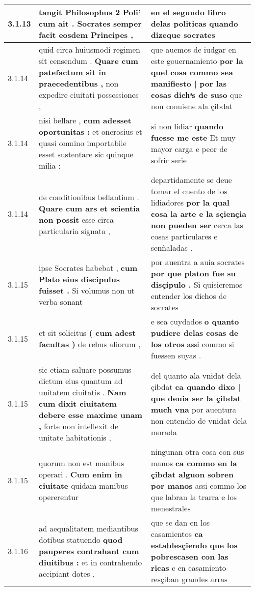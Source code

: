 \begin{tabular}{|p{1cm}|p{6.5cm}|p{6.5cm}|}
3.1.13 & tangit Philosophus 2 Poli’ \textbf{ cum ait . } Socrates semper facit eosdem Principes , & en el segundo libro delas politicas \textbf{ quando } dizeque socrates \\\hline
3.1.14 & quid circa huiusmodi regimen sit censendum . \textbf{ Quare cum patefactum sit in praecedentibus , } non expedire ciuitati possessiones , & que auemos de iudgar en este gouernamiento \textbf{ por la quel cosa commo sea manifiesto | por las cosas dichͣs de suso } que non conuiene ala çibdat \\\hline
3.1.14 & nisi bellare , \textbf{ cum adesset oportunitas : } et onerosius et quasi omnino importabile esset sustentare sic quinque milia : & si non lidiar \textbf{ quando fuesse me este } Et muy mayor carga e peor de sofrir serie \\\hline
3.1.14 & de conditionibus bellantium . \textbf{ Quare cum ars et scientia non possit } esse circa particularia signata , & departidamente se deue tomar el cuento de los lidiadores \textbf{ por la qual cosa la arte e la sçiençia non pueden ser } cerca las cosas particulares e senñaladas . \\\hline
3.1.15 & ipse Socrates habebat , \textbf{ cum Plato eius discipulus fuisset . } Si volumus non ut verba sonant & por auentra a auia socrates \textbf{ por que platon fue su disçipulo . } Si quisieremos entender los dichos de socrates \\\hline
3.1.15 & et sit solicitus \textbf{ ( cum adest facultas ) } de rebus aliorum , & e sea cuydados \textbf{ o quanto pudiere delas cosas de los otros } assi commo si fuessen suyas . \\\hline
3.1.15 & sic etiam saluare possumus dictum eius quantum ad unitatem ciuitatis . \textbf{ Nam cum dixit ciuitatem debere esse maxime unam , } forte non intellexit de unitate habitationis , & del quanto ala vnidat dela çibdat \textbf{ ca quando dixo | que deuia ser la çibdat much vna } por auentura non entendio de vnidat dela morada \\\hline
3.1.15 & quorum non est manibus operari . \textbf{ Cum enim in ciuitate } quidam manibus opererentur & ningunan otra cosa con sus manos \textbf{ ca commo en la çibdat alguon sobren por manos } assi commo los que labran la trarra e los menestrales \\\hline
3.1.16 & ad aequalitatem mediantibus dotibus statuendo \textbf{ quod pauperes contrahant cum diuitibus : } et in contrahendo accipiant dotes , & que se dan en los casamientos \textbf{ ca establesçiendo que los pobrescasen con las ricas } e en casamiento resçiban grandes arras \\\hline

\end{tabular}
